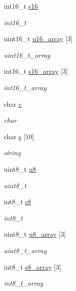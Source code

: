 \begin{DoxyCompactItemize}
int16\+\_\+t \hyperlink{struct____mavlink__test__types__t_a6ab0cae6642964ca13fbf64709b164d0}{s16}
\begin{DoxyCompactList}\small\item\em int16\+\_\+t \end{DoxyCompactList}\item 
uint16\+\_\+t \hyperlink{struct____mavlink__test__types__t_a9ce057247889b7399b84318734f1afbe}{u16\+\_\+array} \mbox{[}3\mbox{]}
\begin{DoxyCompactList}\small\item\em uint16\+\_\+t\+\_\+array \end{DoxyCompactList}\item 
int16\+\_\+t \hyperlink{struct____mavlink__test__types__t_a1218c63f7bc63ab9d6acb081ffe7f25f}{s16\+\_\+array} \mbox{[}3\mbox{]}
\begin{DoxyCompactList}\small\item\em int16\+\_\+t\+\_\+array \end{DoxyCompactList}\item 
char \hyperlink{struct____mavlink__test__types__t_aa40c20757144c710972466c624337241}{c}
\begin{DoxyCompactList}\small\item\em char \end{DoxyCompactList}\item 
char \hyperlink{struct____mavlink__test__types__t_a19c9d24689584a846d513309d740277c}{s} \mbox{[}10\mbox{]}
\begin{DoxyCompactList}\small\item\em string \end{DoxyCompactList}\item 
uint8\+\_\+t \hyperlink{struct____mavlink__test__types__t_a2e20758d4738b63791dbb565f4134a59}{u8}
\begin{DoxyCompactList}\small\item\em uint8\+\_\+t \end{DoxyCompactList}\item 
int8\+\_\+t \hyperlink{struct____mavlink__test__types__t_af79bccd496f740e1f9e80e084f6c3e0e}{s8}
\begin{DoxyCompactList}\small\item\em int8\+\_\+t \end{DoxyCompactList}\item 
uint8\+\_\+t \hyperlink{struct____mavlink__test__types__t_afb8ac88552de20b7e236357ede428cb5}{u8\+\_\+array} \mbox{[}3\mbox{]}
\begin{DoxyCompactList}\small\item\em uint8\+\_\+t\+\_\+array \end{DoxyCompactList}\item 
int8\+\_\+t \hyperlink{struct____mavlink__test__types__t_ae079d0c0ef46fde1c3ba1259383d2c4b}{s8\+\_\+array} \mbox{[}3\mbox{]}
\begin{DoxyCompactList}\small\item\em int8\+\_\+t\+\_\+array \end{DoxyCompactList}\end{DoxyCompactItemize}


